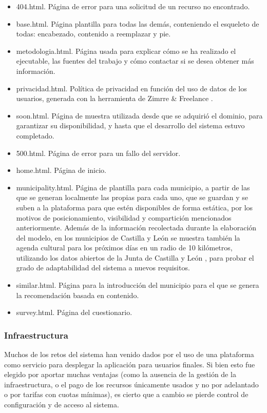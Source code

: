 \begin{itemize}
	\item 404.html. Página de error para una solicitud de un recurso no encontrado.
	\item base.html. Página plantilla para todas las demás, conteniendo el esqueleto de todas: encabezado, contenido a reemplazar y pie.
	\item metodologia.html. Página usada para explicar cómo se ha realizado el ejecutable, las fuentes del trabajo y cómo contactar si se desea obtener más información.
	\item privacidad.html. Política de privacidad en función del uso de datos de los usuarios, generada con la herramienta de Zimrre \& Freelance \cite{privacidad}.
	\item soon.html. Página de muestra utilizada desde que se adquirió el dominio, para garantizar su disponibilidad, y hasta que el desarrollo del sistema estuvo completado.
	\item 500.html. Página de error para un fallo del servidor.
	\item home.html. Página de inicio.
	\item municipality.html. Página de plantilla para cada municipio, a partir de las que se generan localmente las propias para cada uno, que se guardan y se suben a la plataforma para que estén disponibles de forma estática, por los motivos de posicionamiento, visibilidad y compartición mencionados anteriormente. Además de la información recolectada durante la elaboración del modelo, en los municipios de Castilla y León se muestra también la agenda cultural para los próximos días en un radio de 10 kilómetros, utilizando los datos abiertos de la Junta de Castilla y León \cite{agenda}, para probar el grado de adaptabilidad del sistema a nuevos requisitos.
	\item similar.html. Página para la introducción del municipio para el que se genera la recomendación basada en contenido.
	\item survey.html. Página del cuestionario.
\end{itemize}

\subsubsection{Infraestructura}

Muchos de los retos del sistema han venido dados por el uso de una plataforma como servicio para desplegar la aplicación para usuarios finales. Si bien esto fue elegido por aportar muchas ventajas (como la ausencia de la gestión de la infraestructura, o el pago de los recursos únicamente usados y no por adelantado o por tarifas con cuotas mínimas), es cierto que a cambio se pierde control de configuración y de acceso al sistema.

